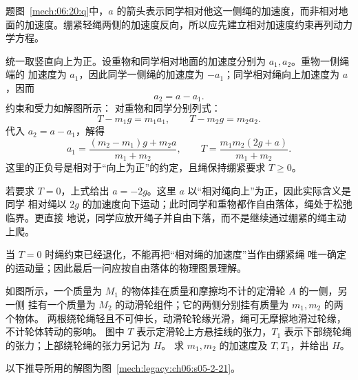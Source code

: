 {\begin{xesolution}题图~\ref{mech:06:20:q}中，$a$ 的箭头表示同学相对他这一侧绳的加速度，而非相对地面的加速度。绷紧轻绳两侧的加速度反向，所以应先建立相对加速度约束再列动力学方程。

统一取竖直向上为正。设重物和同学相对地面的加速度分别为 $a_1,a_2$。重物一侧绳端的
加速度为 $a_1$，因此同学一侧绳的加速度为 $-a_1$；同学相对绳向上加速度为 $a$，因而
\[
 \boxed{a_2=a-a_1}.
\]
约束和受力如解图所示：
\soldiagTwoTwenty
对重物和同学分别列式：
\[
 T-m_1g=m_1a_1,
 \qquad
 T-m_2g=m_2a_2.
\]
代入 $a_2=a-a_1$，解得
\[
 \boxed{a_1=\frac{(m_2-m_1)g+m_2a}{m_1+m_2}},
 \qquad
 \boxed{T=\frac{m_1m_2(2g+a)}{m_1+m_2}}.
\]
这里的正负号是相对于“向上为正”的约定，且绳保持绷紧要求 $T\ge0$。

若要求 $T=0$，上式给出 $a=-2g$。这里 $a$ 以“相对绳向上”为正，因此实际含义是同学
相对绳以 $2g$ 的加速度向下运动；此时同学和重物都作自由落体，绳处于松弛临界。更直接
地说，同学应放开绳子并自由下落，而不是继续通过绷紧的绳主动上爬。

当 $T=0$ 时绳约束已经退化，不能再把“相对绳的加速度”当作由绷紧绳
唯一确定的运动量；因此最后一问应按自由落体的物理图景理解。
\end{xesolution}

\begin{origexamplebox}{}\label{ch06:ex:s05-2-21}
如图所示，一个质量为 $M_1$ 的物体挂在质量和摩擦均不计的定滑轮 $A$ 的一侧，另一侧
挂有一个质量为 $M_2$ 的动滑轮组件；它的两侧分别挂有质量为 $m_1,m_2$ 的两个物体。
两根绕轮绳轻且不可伸长，动滑轮轮缘光滑，绳可无摩擦地滑过轮缘，不计轮体转动的影响。
图中 $T$ 表示定滑轮上方悬挂线的张力，$T_1$ 表示下部绕轮绳的张力；上部绕轮绳的张力另记为 $H$。
求 $m_1,m_2$ 的加速度及 $T,T_1$，并给出 $H$。
\probdiagTwoTwentyOne
\end{origexamplebox}

\begin{xesolution}
以下推导所用的解图为图~\ref{mech:legacy:ch06:s05-2-21}。


\end{xesolution}}
